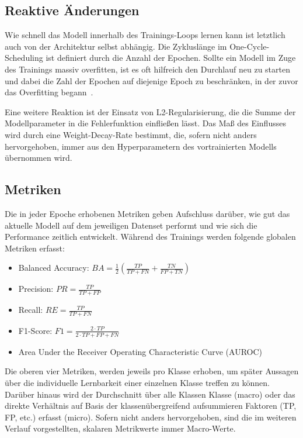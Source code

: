 \subsection{Reaktive Änderungen}
\label{subsec:reaktive-aenderungen}

Wie schnell das Modell innerhalb des Trainings-Loops lernen kann ist letztlich auch von der Architektur selbst abhängig.
Die Zykluslänge im One-Cycle-Scheduling ist definiert durch die Anzahl der Epochen.
Sollte ein Modell im Zuge des Trainings massiv overfitten, ist es oft hilfreich den Durchlauf neu zu starten und dabei die Zahl der Epochen auf diejenige Epoch zu beschränken, in der zuvor das Overfitting begann~\cite{Gugger20}.

Eine weitere Reaktion ist der Einsatz von L2-Regularisierung, die die Summe der Modellparameter in die Fehlerfunktion einfließen lässt.
Das Maß des Einflusses wird durch eine Weight-Decay-Rate bestimmt, die, sofern nicht anders hervorgehoben, immer aus den Hyperparametern des vortrainierten Modells übernommen wird.

\subsection{Metriken}
\label{subsec:metriken}

Die in jeder Epoche erhobenen Metriken geben Aufschluss darüber, wie gut das aktuelle Modell auf dem jeweiligen Datenset performt und wie sich die Performance zeitlich entwickelt.
Während des Trainings werden folgende globalen Metriken erfasst:

\begin{itemize}
    \item Balanced Accuracy: $BA = \frac{1}{2} ( \frac{TP}{TP + FN} + \frac{TN}{FP + TN} )$
    \item Precision: $PR = \frac{TP}{TP+FP}$
    \item Recall: $RE = \frac{TP}{TP+FN}$
    \item F1-Score: $F1 = \frac{2 \cdot TP}{2 \cdot TP + FP + FN}$
    \item Area Under the Receiver Operating Characteristic Curve (AUROC)
\end{itemize}

Die oberen vier Metriken, werden jeweils pro Klasse erhoben, um später Aussagen über die individuelle Lernbarkeit einer einzelnen Klasse treffen zu können.
Darüber hinaus wird der Durchschnitt über alle Klassen Klasse (macro) oder das direkte Verhältnis auf Basis der klassenübergreifend aufsummieren Faktoren (TP, FP, etc.) erfasst (micro).
Sofern nicht anders hervorgehoben, sind die im weiteren Verlauf vorgestellten, skalaren Metrikwerte immer Macro-Werte.

